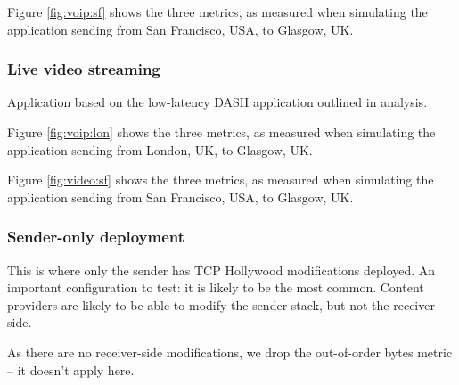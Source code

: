 Figure \ref{fig:voip:sf} shows the three metrics, as measured when
simulating the application sending from San Francisco, USA, to Glasgow, UK.

\subsubsection{Live video streaming}

Application based on the low-latency DASH application outlined in analysis.

\begin{figure*}[t]
	\centering
	\hfill
	\hfill
	\caption{Video streaming simulation from London, UK to Glasgow, UK - both TCP Hollywood hosts}
	\label{fig:voip:lon}
\end{figure*}

Figure \ref{fig:voip:lon} shows the three metrics, as measured when
simulating the application sending from London, UK, to Glasgow, UK.

\begin{figure*}[t]
	\centering
	\hfill
	\hfill
	\caption{Video streaming from San Francisco, UK to Glasgow, UK - both TCP Hollywood hosts}
	\label{fig:video:sf}
\end{figure*}

Figure \ref{fig:video:sf} shows the three metrics, as measured when
simulating the application sending from San Francisco, USA, to Glasgow, UK.

\subsubsection{Sender-only deployment}

This is where only the sender has TCP Hollywood modifications deployed.
An important configuration to test: it is likely to be the most common.
Content providers are likely to be able to modify the sender stack, but not
the receiver-side.

As there are no receiver-side modifications, we drop the out-of-order bytes
metric -- it doesn't apply here.

